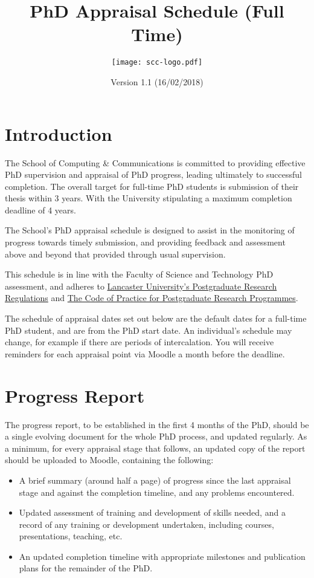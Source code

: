 \documentclass[12pt,a4paper]{article}
\title{PhD Appraisal Schedule (Full Time)}
\author{\texttt{[image: scc-logo.pdf]}}
\date{Version 1.1 (16/02/2018)}
\begin{document}
\maketitle

\section{Introduction}
The School of Computing \& Communications is committed to providing effective PhD supervision and appraisal of PhD progress, leading ultimately to successful completion. The overall target for full-time PhD students is submission of their thesis within 3 years. With the University stipulating a maximum completion deadline of 4 years.

The School's PhD appraisal schedule is designed to assist in the monitoring of progress towards timely submission, and providing feedback and assessment above and beyond that provided through usual supervision.

This schedule is in line with the Faculty of Science and Technology PhD assessment, and adheres to
\href{https://gap.lancs.ac.uk/ASQ/QAE/MARP/Documents/PGR-Regs.pdf}{Lancaster University's Postgraduate Research Regulations} and 
\href{https://gap.lancs.ac.uk/ASQ/Policies/Documents/Postgraduate-Research-Code-of-Practice.pdf}{The Code of Practice for Postgraduate Research Programmes}.

The schedule of appraisal dates set out below are the default dates for a full-time PhD student, and are from the PhD start date. An individual's schedule may change, for example if there are periods of intercalation. You will receive reminders for each appraisal point via Moodle a month before the deadline.

\section{Progress Report}
The progress report, to be established in the first 4 months of the PhD, should be a single evolving document for the whole PhD process, and updated regularly. As a minimum, for every appraisal stage that follows, an updated copy of the report should be uploaded to Moodle, containing the following:
\begin{itemize}
	\item A brief summary (around half a page) of progress since the last appraisal stage and against the completion timeline, and any problems encountered.
	\item Updated assessment of training and development of skills needed, and a record of any training or development undertaken, including courses, presentations, teaching, etc.\
	\item An updated completion timeline with appropriate milestones and publication plans for the remainder of the PhD.
\end{itemize}
\end{document}

